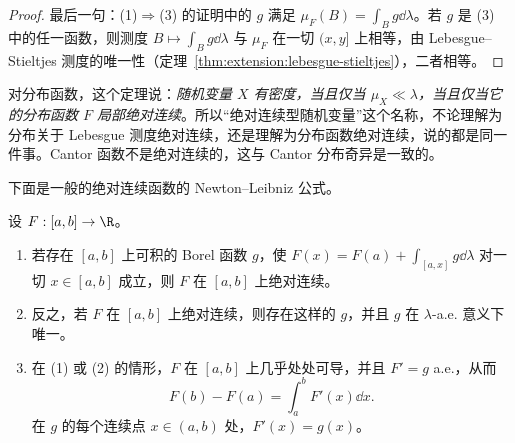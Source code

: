 \begin{proof}
最后一句：(1)$\Rightarrow$(3) 的证明中的 $g$ 满足 $\mu_F(B)=\int_Bg\dd\lambda$。若 $g$ 是 (3) 中的任一函数，则测度 $B\mapsto\int_Bg\dd\lambda$ 与 $\mu_F$ 在一切 $(x,y]$ 上相等，由 Lebesgue--Stieltjes 测度的唯一性（定理~\ref{thm:extension:lebesgue-stieltjes}），二者相等。
\end{proof}

对分布函数，这个定理说：\emph{随机变量 $X$ 有密度，当且仅当 $\mu_X\ll\lambda$，当且仅当它的分布函数 $F$ 局部绝对连续}。所以“绝对连续型随机变量”这个名称，不论理解为分布关于 Lebesgue 测度绝对连续，还是理解为分布函数绝对连续，说的都是同一件事。Cantor 函数不是绝对连续的，这与 Cantor 分布奇异是一致的。

下面是一般的绝对连续函数的 Newton--Leibniz 公式。

\begin{theorem}\label{thm:ac:newton-leibniz}
设 $F:[a,b]\to\R$。
\begin{enumerate}
\item 若存在 $[a,b]$ 上可积的 Borel 函数 $g$，使 $F(x)=F(a)+\int_{[a,x]}g\dd\lambda$ 对一切 $x\in[a,b]$ 成立，则 $F$ 在 $[a,b]$ 上绝对连续。
\item 反之，若 $F$ 在 $[a,b]$ 上绝对连续，则存在这样的 $g$，并且 $g$ 在 $\lambda$-a.e. 意义下唯一。
\item 在 (1) 或 (2) 的情形，$F$ 在 $[a,b]$ 上几乎处处可导，并且 $F'=g$ a.e.，从而
\[
F(b)-F(a)=\int_a^bF'(x)\dd x .
\]
在 $g$ 的每个连续点 $x\in(a,b)$ 处，$F'(x)=g(x)$。
\end{enumerate}
\end{theorem}
